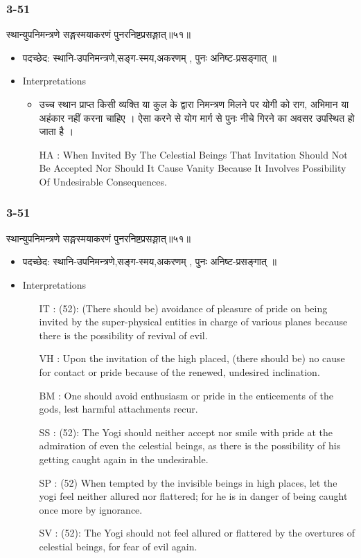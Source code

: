 \begin{frame}[fragile]\frametitle{3-51}
\begin{sanskrit}
स्थान्युपनिमन्त्रणे सङ्गस्मयाकरणं पुनरनिष्टप्रसङ्गात्॥५१॥
\end{sanskrit}

	\begin{itemize}
	\item पदच्छेद:  स्थानि-उपनिमन्त्रणे,सङ्ग-स्मय,अकरणम् , पुनः अनिष्ट-प्रसङ्गात् ॥
	\item Interpretations
		\begin{itemize}	
		\item  उच्च स्थान प्राप्त किसी व्यक्ति या कुल के द्वारा निमन्त्रण मिलने पर योगी को राग, अभिमान या अहंकार नहीं करना चाहिए । ऐसा करने से योग मार्ग से पुनः नीचे गिरने का अवसर उपस्थित हो जाता है ।
		\item [HA]: When Invited By The Celestial Beings That Invitation Should Not Be Accepted Nor Should It Cause Vanity Because It Involves Possibility Of Undesirable Consequences.
		\end{itemize}
	\end{itemize}
\end{frame}

\begin{frame}[fragile]\frametitle{3-51}
\begin{sanskrit}
स्थान्युपनिमन्त्रणे सङ्गस्मयाकरणं पुनरनिष्टप्रसङ्गात्॥५१॥
\end{sanskrit}

	\begin{itemize}
	\item पदच्छेद:  स्थानि-उपनिमन्त्रणे,सङ्ग-स्मय,अकरणम् , पुनः अनिष्ट-प्रसङ्गात् ॥
	\item Interpretations
		\begin{itemize}	
		\item [IT]: (52): (There should be) avoidance of pleasure of pride on being invited by the super-physical entities in charge of various planes because there is the possibility of revival of evil.
		\item [VH]: Upon the invitation of the high placed, (there should be) no cause for contact or pride because of the renewed, undesired inclination.
		\item [BM]: One should avoid enthusiasm or pride in the enticements of the gods, lest harmful attachments recur.
		\item [SS]: (52): The Yogi should neither accept nor smile with pride at the admiration of even the celestial beings, as there is the possibility of his getting caught again in the undesirable.
		\item [SP]: (52) When tempted by the invisible beings in high places, let the yogi feel neither allured nor flattered; for he is in danger of being caught once more by ignorance.
		\item [SV]: (52): The Yogi should not feel allured or flattered by the overtures of celestial beings, for fear of evil again. 
		\end{itemize}
	\end{itemize}
\end{frame}

